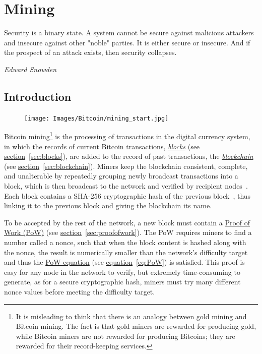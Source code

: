 \chapter{Mining}
%
\epigraph{Security is a binary state. A system cannot be secure against malicious attackers and insecure against other "noble" parties. It is either secure or insecure. And if the prospect of an attack exists, then security collapses.}{\textit{Edward Snowden}}
\section{Introduction}
\setlength{\intextsep}{0pt}
\begin{figure}
\centering
\texttt{[image: Images/Bitcoin/mining\_start.jpg]}
\end{figure}
Bitcoin mining\footnote{It is misleading to think that there is an analogy between gold mining and Bitcoin mining. The fact is that gold miners are rewarded for producing gold, while Bitcoin miners are not rewarded for producing Bitcoins; they are rewarded for their record-keeping services.} is the processing of transactions in the digital currency system, in which the records of current Bitcoin transactions, \hyperref[sec:blocks]{\emph{blocks}} (see \hyperref[sec:blocks]{section}~\ref{sec:blocks}), are added to the record of past transactions, the \hyperref[sec:blockchain]{\emph{blockchain}} (see \hyperref[sec:blockchain]{section}~\ref{sec:blockchain}). Miners keep the blockchain consistent, complete, and unalterable by repeatedly grouping newly broadcast transactions into a block, which is then broadcast to the network and verified by recipient nodes~\cite{economist}. Each block contains a SHA-256 cryptographic hash of the previous block~\cite{economist}, thus linking it to the previous block and giving the blockchain its name.

To be accepted by the rest of the network, a new block must contain a \hyperref[sec:proofofwork]{Proof of Work (PoW)} (see \hyperref[sec:proofofwork]{section}~\ref{sec:proofofwork}). The PoW requires miners to find a number called a nonce, such that when the block content is hashed along with the nonce, the result is numerically smaller than the network's difficulty target~\cite{Nakamoto_bitcoin:a} and thus the \hyperref[eq:PoW]{PoW equation} (see \hyperref[eq:PoW]{equation}~\ref{eq:PoW}) is satisfied. This proof is easy for any node in the network to verify, but extremely time-consuming to generate, as for a secure cryptographic hash, miners must try many different nonce values before meeting the difficulty target.

